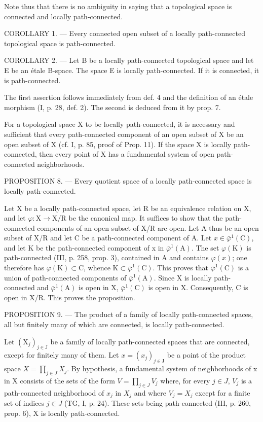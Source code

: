 Note thus that there is no ambiguity in saying that a topological space is connected and locally path-connected.

COROLLARY 1. --- Every connected open subset of a locally path-connected topological space is path-connected.

COROLLARY 2. --- Let B be a locally path-connected topological space and let E be an étale B-space. The space E is locally path-connected. If it is connected, it is path-connected.

The first assertion follows immediately from def. 4 and the definition of an étale morphism (I, p. 28, def. 2). The second is deduced from it by prop. 7.

For a topological space X to be locally path-connected, it is necessary and sufficient that every path-connected component of an open subset of X be an open subset of X (cf. I, p. 85, proof of Prop. 11). If the space X is locally path-connected, then every point of X has a fundamental system of open path-connected neighborhoods.

PROPOSITION 8. --- Every quotient space of a locally path-connected space is locally path-connected.

Let X be a locally path-connected space, let R be an equivalence relation on X, and let \(\varphi\colon\mathrm{X}\to\mathrm{X}/\mathrm{R}\) be the canonical map. It suffices to show that the path-connected components of an open subset of X/R are open. Let A thus be an open subset of X/R and let C be a path-connected component of A. Let \(x\in\bar{\varphi}^{1}(\mathrm{C})\), and let K be the path-connected component of x in \(\bar{\varphi}^{1}(\mathrm{A})\). The set \(\varphi(\mathrm{K})\) is path-connected (III, p. 258, prop. 3), contained in A and contains \(\varphi(x)\); one therefore has \(\varphi(\mathrm{K})\subset\mathrm{C}\), whence \(\mathrm{K}\subset\bar{\varphi}^{1}(\mathrm{C})\). This proves that \(\bar{\varphi}^{1}(\mathrm{C})\) is a union of path-connected components of \(\bar{\varphi}^{1}(\mathrm{A})\). Since X is locally path-connected and \(\bar{\varphi}^{1}(\mathrm{A})\) is open in X, \(\bar{\varphi}^{1}(\mathrm{C})\) is open in X. Consequently, C is open in X/R. This proves the proposition.

PROPOSITION 9. --- The product of a family of locally path-connected spaces, all but finitely many of which are connected, is locally path-connected.

Let \((\mathrm{X}_{j})_{j\in\mathrm{J}}\) be a family of locally path-connected spaces that are connected, except for finitely many of them. Let \(x=(x_{j})_{j\in\mathrm{J}}\) be a point of the product space \(X=\prod_{j\in J}X_{j}\). By hypothesis, a fundamental system of neighborhoods of x in X consists of the sets of the form \(V=\prod_{j\in J}V_{j}\) where, for every \(j\in J\), \(V_{j}\) is a path-connected neighborhood of \(x_{j}\) in \(X_{j}\) and where \(V_{j}=X_{j}\) except for a finite set of indices \(j\in J\) (TG, I, p. 24). These sets being path-connected (III, p. 260, prop. 6), X is locally path-connected.

